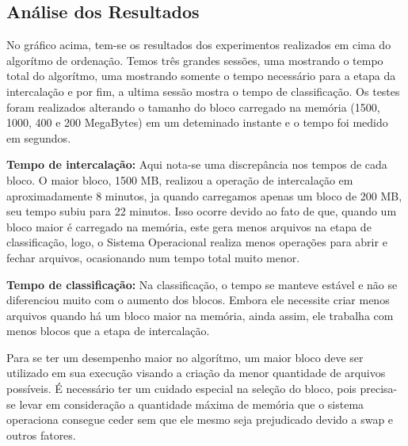 \subsection{Análise dos Resultados}
\par
No gráfico acima, tem-se os resultados dos experimentos realizados em cima do algorítmo de ordenação. Temos três grandes sessões, uma mostrando o tempo total do algorítmo, uma mostrando somente o tempo necessário para a etapa da intercalação e por fim, a ultima sessão mostra o tempo de classificação. Os testes foram realizados alterando o tamanho do bloco carregado na memória (1500, 1000, 400 e 200 MegaBytes) em um deteminado instante e o tempo foi medido em segundos.
\par
\textbf{Tempo de intercalação:} Aqui nota-se uma discrepância nos tempos de cada bloco. O maior bloco, 1500 MB, realizou a operação de intercalação em aproximadamente 8 minutos, ja quando carregamos apenas um bloco de 200 MB, seu tempo subiu para 22 minutos. Isso ocorre devido ao fato de que, quando um bloco maior é carregado na memória, este gera menos arquivos na etapa de classificação, logo, o Sistema Operacional realiza menos operações para abrir e fechar arquivos, ocasionando num tempo total muito menor.
\par
\textbf{Tempo de classificação:} Na classificação, o tempo se manteve estável e não se diferenciou muito com o aumento dos blocos. Embora ele necessite criar menos arquivos quando há um bloco maior na memória, ainda assim, ele trabalha com menos blocos que a etapa de intercalação.
\par
Para se ter um desempenho maior no algorítmo, um maior bloco deve ser utilizado em sua execução visando a criação da menor quantidade de arquivos possíveis. É necessário ter um cuidado especial na seleção do bloco, pois precisa-se levar em consideração a quantidade máxima de memória que o sistema operaciona consegue ceder sem que ele mesmo seja prejudicado devido a swap e outros fatores.